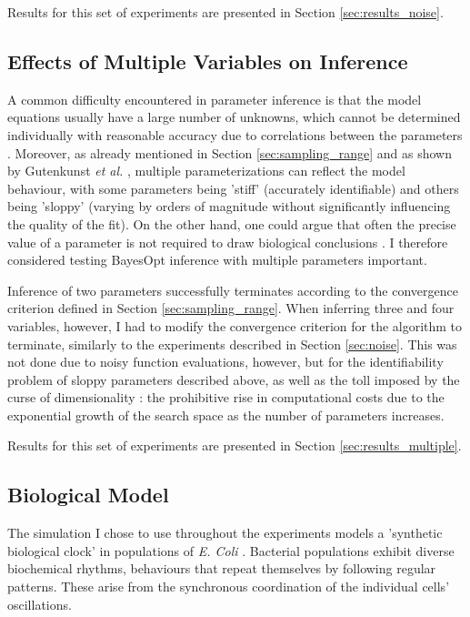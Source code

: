 \documentclass[bsc,frontabs,singlespacing,parskip,deptreport]{infthesis}
\begin{document}
Results for this set of experiments are presented in Section \ref{sec:results_noise}.

\subsection{Effects of Multiple Variables on Inference}\label{sec:multiple}
A common difficulty encountered in parameter inference is that the model equations usually have a large number of unknowns, which cannot be determined individually with reasonable accuracy due to correlations between the parameters \cite{pmid19215296, pmid18817540}. Moreover, as already mentioned in Section \ref{sec:sampling_range} and as shown by Gutenkunst \textit{et al.} \cite{pmid17922568}, multiple parameterizations can reflect the model behaviour, with some parameters being 'stiff' (accurately identifiable) and others being 'sloppy' (varying by orders of magnitude without significantly influencing the quality of the fit). On the other hand, one could argue that often the precise value of a parameter is not required to draw biological conclusions \cite{pmid18817540}. I therefore considered testing BayesOpt inference with multiple parameters important.

Inference of two parameters successfully terminates according to the convergence criterion defined in Section \ref{sec:sampling_range}. When inferring three and four variables, however, I had to modify the convergence criterion for the algorithm to terminate, similarly to the experiments described in Section \ref{sec:noise}. This was not done due to noisy function evaluations, however, but for the identifiability problem of sloppy parameters described above, as well as the toll imposed by the curse of dimensionality \cite{kuo2005lifting}: the prohibitive rise in computational costs due to the exponential growth of the search space as the number of parameters increases.

Results for this set of experiments are presented in Section \ref{sec:results_multiple}.


\subsection{Biological Model}\label{sec:biological_model}
The simulation I chose to use throughout the experiments models a 'synthetic biological clock' in populations of \textit{E. Coli} \cite{doi:10.1073/pnas.0307095101}. Bacterial populations exhibit diverse biochemical rhythms, behaviours that repeat themselves by following regular patterns. These arise from the synchronous coordination of the individual cells' oscillations.
\end{document}
